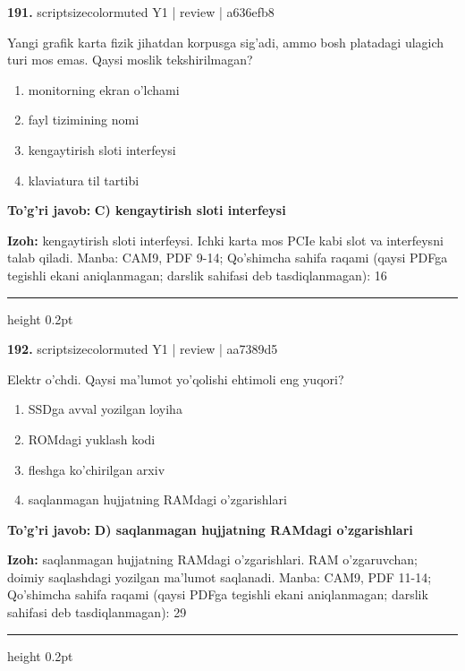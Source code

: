 \documentclass[10pt,a4paper]{article}
\begin{document}
{\bfseries\sffamily\color{ink} 191.} {scriptsizecolor{muted} Y1 | review | a636efb8}
\par
Yangi grafik karta fizik jihatdan korpusga sig'adi, ammo bosh platadagi ulagich turi mos emas. Qaysi moslik tekshirilmagan?
\begin{enumerate}[label=\Alph*),leftmargin=9mm]
\item monitorning ekran o'lchami
\item fayl tizimining nomi
\item kengaytirish sloti interfeysi
\item klaviatura til tartibi
\end{enumerate}
\begin{tcolorbox}[enhanced,breakable,colback=teal!4,colframe=teal!60!black,boxrule=0.45pt,arc=1.2mm,left=2.7mm,right=2.7mm,top=1.8mm,bottom=1.8mm,before skip=2mm,after skip=2mm]
{\bfseries\sffamily\color{teal}To'g'ri javob:} \textbf{C) kengaytirish sloti interfeysi}
\par\smallskip
{\bfseries Izoh:} kengaytirish sloti interfeysi. Ichki karta mos PCIe kabi slot va interfeysni talab qiladi. Manba: CAM9, PDF 9-14; Qo'shimcha sahifa raqami (qaysi PDFga tegishli ekani aniqlanmagan; darslik sahifasi deb tasdiqlanmagan): 16
\end{tcolorbox}
\vspace{2mm}\hrule height 0.2pt\vspace{3mm}

{\bfseries\sffamily\color{ink} 192.} {scriptsizecolor{muted} Y1 | review | aa7389d5}
\par
Elektr o'chdi. Qaysi ma'lumot yo'qolishi ehtimoli eng yuqori?
\begin{enumerate}[label=\Alph*),leftmargin=9mm]
\item SSDga avval yozilgan loyiha
\item ROMdagi yuklash kodi
\item fleshga ko'chirilgan arxiv
\item saqlanmagan hujjatning RAMdagi o'zgarishlari
\end{enumerate}
\begin{tcolorbox}[enhanced,breakable,colback=teal!4,colframe=teal!60!black,boxrule=0.45pt,arc=1.2mm,left=2.7mm,right=2.7mm,top=1.8mm,bottom=1.8mm,before skip=2mm,after skip=2mm]
{\bfseries\sffamily\color{teal}To'g'ri javob:} \textbf{D) saqlanmagan hujjatning RAMdagi o'zgarishlari}
\par\smallskip
{\bfseries Izoh:} saqlanmagan hujjatning RAMdagi o'zgarishlari. RAM o'zgaruvchan; doimiy saqlashdagi yozilgan ma'lumot saqlanadi. Manba: CAM9, PDF 11-14; Qo'shimcha sahifa raqami (qaysi PDFga tegishli ekani aniqlanmagan; darslik sahifasi deb tasdiqlanmagan): 29
\end{tcolorbox}
\vspace{2mm}\hrule height 0.2pt\vspace{3mm}
\end{document}
